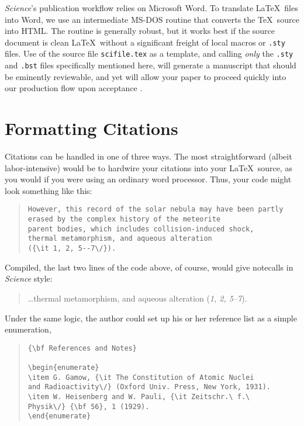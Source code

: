 \documentclass[10pt]{article}
\begin{document}
{\it Science\/}'s publication workflow relies on Microsoft Word.  To
translate \LaTeX\ files into Word, we use an intermediate MS-DOS
routine \cite{tth} that converts the \TeX\ source into HTML\@.  The
routine is generally robust, but it works best if the source document
is clean \LaTeX\ without a significant freight of local macros or
\texttt{.sty} files.  Use of the source file \texttt{scifile.tex} as a
template, and calling {\it only\/} the \texttt{.sty} and \texttt{.bst}
files specifically mentioned here, will generate a manuscript that
should be eminently reviewable, and yet will allow your paper to
proceed quickly into our production flow upon acceptance \cite{use2e}.


\section*{Formatting Citations}

Citations can be handled in one of three ways.  The most
straightforward (albeit labor-intensive) would be to hardwire your
citations into your \LaTeX\ source, as you would if you were using an
ordinary word processor.  Thus, your code might look something like
this:


\begin{quote}
\begin{verbatim}
However, this record of the solar nebula may have been partly erased by the complex history of the meteorite
parent bodies, which includes collision-induced shock,
thermal metamorphism, and aqueous alteration
({\it 1, 2, 5--7\/}).
\end{verbatim}
\end{quote}


\noindent Compiled, the last two lines of the code above, of course, would give notecalls in {\it Science\/} style:

\begin{quote}
\ldots thermal metamorphism, and aqueous alteration ({\it 1, 2, 5--7\/}).
\end{quote}

Under the same logic, the author could set up his or her reference list as a simple enumeration,

\begin{quote}
\begin{verbatim}
{\bf References and Notes}

\begin{enumerate}
\item G. Gamow, {\it The Constitution of Atomic Nuclei
and Radioactivity\/} (Oxford Univ. Press, New York, 1931).
\item W. Heisenberg and W. Pauli, {\it Zeitschr.\ f.\ 
Physik\/} {\bf 56}, 1 (1929).
\end{enumerate}
\end{verbatim}
\end{quote}
\end{document}
